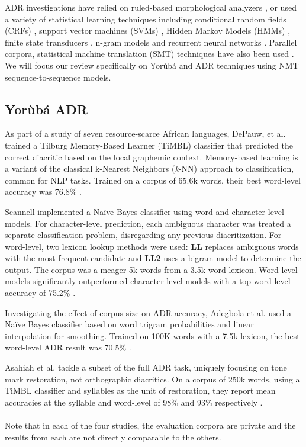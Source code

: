 \documentclass[a4paper]{article}
\begin{document}
ADR investigations have relied on ruled-based morphological analyzers \cite{novak2015automatic}\cite{raza2010automatic}, or used a variety of statistical learning techniques including conditional random fields (CRFs) \cite{schlippe2008diacritization}, support vector machines (SVMs) \cite{luu2012pointwise}, Hidden Markov Models (HMMs) \cite{khorsheed2012hmm}, finite state transducers \cite{nelken2005arabic}, n-gram models \cite{raza2010automatic} and recurrent neural networks \cite{belinkov2015arabic}. Parallel corpora, statistical machine translation (SMT) techniques have also been used \cite{novak2015automatic}\cite{schlippe2008diacritization}. We will focus our review specifically on Yor{\`u}b{\'a} and ADR techniques using NMT sequence-to-sequence models. 

\subsection{Yor{\`u}b{\'a} ADR}
As part of a study of seven resource-scarce African languages, DePauw, et al. trained a Tilburg Memory-Based Learner (TiMBL) classifier that predicted the correct diacritic based on the local graphemic context. Memory-based learning is a variant of the classical k-Nearest Neighbors (\emph{k}-NN) approach to classification, common for NLP tasks. Trained on a corpus of 65.6k words, their best word-level accuracy was 76.8\% \cite{de2007automatic}. 

Scannell implemented a Na{\"i}ve Bayes classifier using word and character-level models. For character-level prediction, each ambiguous character was treated a separate classification problem, disregarding any previous diacritization. For word-level, two lexicon lookup methods were used: \textbf{LL}  replaces ambiguous words with the most frequent candidate and \textbf{LL2} uses a bigram model to determine the output. The corpus was a meager 5k words from a 3.5k word lexicon. Word-level models significantly outperformed character-level models with a top word-level accuracy of 75.2\% \cite{scannell2011statistical}.

Investigating the effect of corpus size on ADR accuracy, Adegbola et al. used a Na{\"i}ve Bayes classifier based on word trigram probabilities and linear interpolation for smoothing. Trained on 100K words with a 7.5k lexicon, the best word-level ADR result was 70.5\% \cite{adegbola2012quantifying}.

Asahiah et al. tackle a subset of the full ADR task, uniquely focusing on tone mark restoration, not orthographic diacritics. On a corpus of 250k words, using a TiMBL classifier and syllables as the unit of restoration, they report mean accuracies at the syllable and word-level of 98\% and 93\% respectively \cite{asahiah2017restoring}.
\\
\\
Note that in each of the four studies, the evaluation corpora are private and the results from each are not directly comparable to the others.
\end{document}
